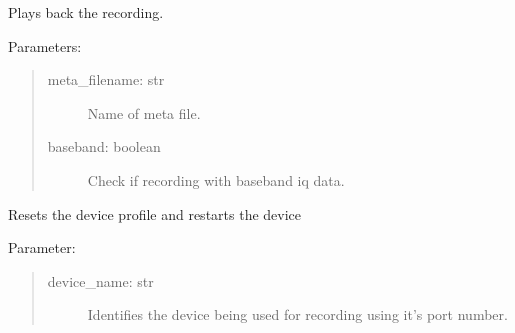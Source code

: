 \documentclass[letterpaper,10pt,english]{sphinxmanual}
\begin{document}

\begin{fulllineitems}
\label{\detokenize{X4 radar:X4_record_playback.playback_recording}}
Plays back the recording.

Parameters:
\begin{quote}
\begin{description}
\item[{meta\_filename: str}] \leavevmode
Name of meta file.

\item[{baseband: boolean}] \leavevmode
Check if recording with baseband iq data.

\end{description}
\end{quote}

\end{fulllineitems}


\begin{fulllineitems}
\label{\detokenize{X4 radar:X4_record_playback.reset}}
Resets the device profile and restarts the device

Parameter:
\begin{quote}
\begin{description}
\item[{device\_name: str}] \leavevmode
Identifies the device being used for recording using it’s port number.

\end{description}
\end{quote}

\end{fulllineitems}

\end{document}
